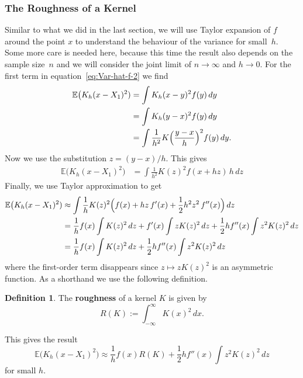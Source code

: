 \documentclass[
  a4paper,
]{article}
\theoremstyle{definition}
\newtheorem{definition}{Definition}[section]
\theoremstyle{definition}
\theoremstyle{definition}
\theoremstyle{definition}
\theoremstyle{remark}
\begin{document}
\hypertarget{the-roughness-of-a-kernel}{%
\subsubsection{The Roughness of a Kernel}\label{the-roughness-of-a-kernel}}

Similar to what we did in the last section, we will use Taylor expansion
of \(f\) around the point \(x\) to understand the behaviour of the variance
for small~\(h\). Some more care is needed here, because this time the
result also depends on the sample size~\(n\) and we will consider the joint
limit of \(n \to \infty\) and \(h\to 0\). For the first term in
equation~\eqref{eq:Var-hat-f-2} we find
\begin{align*}
  \mathbb{E}\bigl( K_h(x - X_1)^2 )
  &= \int K_h(x - y)^2 f(y) \,dy \\
  &= \int K_h(y - x)^2 f(y) \,dy \\
  &= \int \frac{1}{h^2} K\Bigl( \frac{y - x}{h} \Bigr)^2 f(y) \,dy.
\end{align*}
Now we use the substitution \(z = (y - x) / h\). This gives
\begin{align*}
  \mathbb{E}\bigl( K_h(x - X_1)^2 )
  &= \int \frac{1}{h^2} K(z)^2 f(x + hz) \,h \,dz
\end{align*}
Finally, we use Taylor approximation to get
\begin{align*}
  \mathbb{E}\bigl( K_h(x - X_1)^2 )
  &\approx \int \frac{1}{h} K(z)^2 \Bigl( f(x) + hz\,f'(x) + \frac12 h^2 z^2 \,f''(x) \Bigr) \,dz \\
  &= \frac{1}{h} f(x) \int K(z)^2 \,dz
      + f'(x) \int z K(z)^2 \,dz
      + \frac12 h f''(x) \int z^2 K(z)^2 \,dz \\
  &= \frac{1}{h} f(x) \int K(z)^2 \,dz
      + \frac12 h f''(x) \int z^2 K(z)^2 \,dz
\end{align*}
where the first-order term disappears since \(z \mapsto z K(z)^2\) is an
asymmetric function. As a shorthand we use the following definition.

\begin{definition}
The \textbf{roughness} of a kernel \(K\) is given by
\begin{equation*}
  R(K)
  := \int_{-\infty}^\infty K(x)^2 \,dx.
\end{equation*}
\end{definition}

This gives the result
\begin{equation}
  \mathbb{E}\bigl( K_h(x - X_1)^2 \bigr)
  \approx \frac{1}{h} f(x) R(K) + \frac12 h f''(x) \int z^2 K(z)^2 \,dz
                             \label{eq:Var-frag1}
\end{equation}
for small \(h\).
\end{document}
